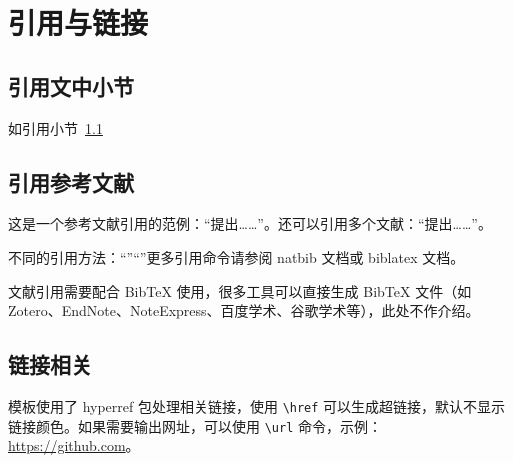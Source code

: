 \chapter{引用与链接}

\section{引用文中小节}\label{sec:ref}
如引用小节~\ref{sec:ref}

\section{引用参考文献}
这是一个参考文献引用的范例：“\cite{江泽民1989能源发展趋势及主要节能措施}提出……”。还可以引用多个文献：“\cite{kuhn2004man,江泽民2008新时期我国信息技术产业的发展,江泽民1989能源发展趋势及主要节能措施}提出……”。

不同的引用方法：“\citet{江泽民1989能源发展趋势及主要节能措施}”“\citep{江泽民2008新时期我国信息技术产业的发展}”更多引用命令请参阅 natbib 文档或 biblatex 文档。\nocite{*}

文献引用需要配合 BibTeX 使用，很多工具可以直接生成 BibTeX 文件（如 Zotero、EndNote、NoteExpress、百度学术、谷歌学术等），此处不作介绍。

\section{链接相关}
模板使用了 hyperref 包处理相关链接，使用 \verb|\href| 可以生成超链接，默认不显示链接颜色。如果需要输出网址，可以使用 \verb|\url| 命令，示例：\url{https://github.com}。